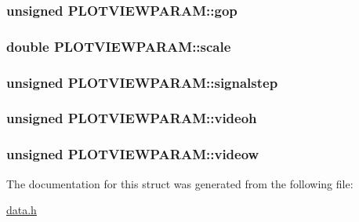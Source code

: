 \hypertarget{struct_p_l_o_t_v_i_e_w_p_a_r_a_m_c23a43d5e164e2b9646ebcb6dea4b83e}{
\subsubsection[{gop}]{\setlength{\rightskip}{0pt plus 5cm}unsigned {\bf PLOTVIEWPARAM::gop}}}
\label{struct_p_l_o_t_v_i_e_w_p_a_r_a_m_c23a43d5e164e2b9646ebcb6dea4b83e}


\hypertarget{struct_p_l_o_t_v_i_e_w_p_a_r_a_m_57c57129bc0151bb9cc8040e9b9c5d51}{
\subsubsection[{scale}]{\setlength{\rightskip}{0pt plus 5cm}double {\bf PLOTVIEWPARAM::scale}}}
\label{struct_p_l_o_t_v_i_e_w_p_a_r_a_m_57c57129bc0151bb9cc8040e9b9c5d51}


\hypertarget{struct_p_l_o_t_v_i_e_w_p_a_r_a_m_dc087da1d2f3036ad7b218995873a448}{
\subsubsection[{signalstep}]{\setlength{\rightskip}{0pt plus 5cm}unsigned {\bf PLOTVIEWPARAM::signalstep}}}
\label{struct_p_l_o_t_v_i_e_w_p_a_r_a_m_dc087da1d2f3036ad7b218995873a448}


\hypertarget{struct_p_l_o_t_v_i_e_w_p_a_r_a_m_536e1df50bf3d400fb99b4e54e87613a}{
\subsubsection[{videoh}]{\setlength{\rightskip}{0pt plus 5cm}unsigned {\bf PLOTVIEWPARAM::videoh}}}
\label{struct_p_l_o_t_v_i_e_w_p_a_r_a_m_536e1df50bf3d400fb99b4e54e87613a}


\hypertarget{struct_p_l_o_t_v_i_e_w_p_a_r_a_m_b033c45c1fea368d6bd06a61b33e5b0a}{
\subsubsection[{videow}]{\setlength{\rightskip}{0pt plus 5cm}unsigned {\bf PLOTVIEWPARAM::videow}}}
\label{struct_p_l_o_t_v_i_e_w_p_a_r_a_m_b033c45c1fea368d6bd06a61b33e5b0a}




The documentation for this struct was generated from the following file:\begin{CompactItemize}
\item 
\hyperlink{data_8h}{data.h}\end{CompactItemize}
